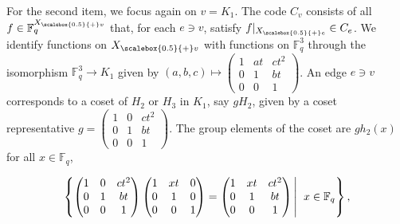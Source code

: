 For the second item, we focus again on $v=K_{1}$. The code $C_{v}$ consists of all $f\in\mathbb{F}_{q}^{{X}_{\scalebox{0.5}{+}v}}$ that, for each $e\ni v$, satisfy $f|_{{X}_{\scalebox{0.5}{+}e}}\in C_{e}$. We identify functions on ${X}_{\scalebox{0.5}{+}v}$ with functions on $\mathbb{F}_{q}^{3}$ through the isomorphism $\mathbb{F}_{q}^{3}\to K_{1}$ given by $(a,b,c)\mapsto\begin{pmatrix}1&at&ct^{2}\\
0&1&bt\\
0&0&1\end{pmatrix}$. An edge $e\ni v$ corresponds to a coset of $H_{2}$ or $H_{3}$ in $K_{1}$, say $gH_{2}$, given by a coset representative $g=\begin{pmatrix}1&0&ct^{2}\\
0&1&bt\\
0&0&1\end{pmatrix}$. The group elements of the coset are $gh_{2}(x)$ for all $x\in\mathbb{F}_{q}$,\par


\[\begin{gathered}
\displaystyle\left\{\begin{pmatrix}1&0&ct^{2}\\
0&1&bt\\
0&0&1\end{pmatrix}\begin{pmatrix}1&xt&0\\
0&1&0\\
0&0&1\end{pmatrix}=\begin{pmatrix}1&xt&ct^{2}\\
0&1&bt\\
0&0&1\end{pmatrix}\left|\;\vphantom{\begin{pmatrix}1&0&ct^{2}\\
0&1&bt\\
0&0&1\end{pmatrix}\begin{pmatrix}1&xt&0\\
0&1&0\\
0&0&1\end{pmatrix}=\begin{pmatrix}1&xt&ct^{2}\\
0&1&bt\\
0&0&1\end{pmatrix}x\in\mathbb{F}_{q}}\right.x\in\mathbb{F}_{q}\right\},
\end{gathered}\]


